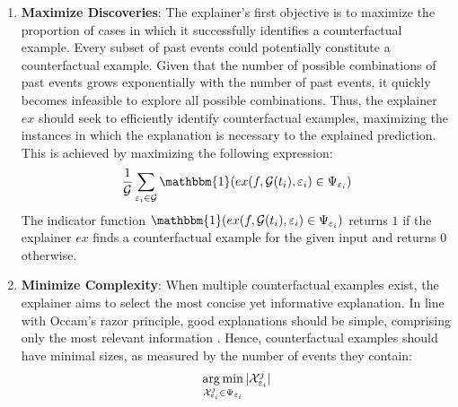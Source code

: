 \begin{enumerate}
    \item \textbf{Maximize Discoveries}: The explainer's first objective is to maximize the proportion of cases in which it successfully identifies a counterfactual example. Every subset of past events could potentially constitute a counterfactual example. Given that the number of possible combinations of past events grows exponentially with the number of past events, it quickly becomes infeasible to explore all possible combinations. Thus, the explainer $ex$ should seek to efficiently identify counterfactual examples, maximizing the instances in which the explanation is necessary to the explained prediction. This is achieved by maximizing the following expression:
    \begin{equation}
        \label{e_maxExplanationRate}
        \frac{1}{\mathcal{G}} \sum_{\varepsilon_{i} \in \mathcal{G}} \mathbbm{1}(ex(f, \mathcal{G}(t_i), \varepsilon_{i}) \in \Psi_{\varepsilon_i})
    \end{equation}
    The indicator function $\mathbbm{1}(ex(f, \mathcal{G}(t_i), \varepsilon_{i}) \in \Psi_{\varepsilon_i})$ returns $1$ if the explainer $ex$ finds a counterfactual example for the given input and returns $0$ otherwise.
    \item \textbf{Minimize Complexity}: When multiple counterfactual examples exist, the explainer aims to select the most concise yet informative explanation. In line with Occam’s razor principle, good explanations should be simple, comprising only the most relevant information \cite{yuan_explainability_2020, tan_learning_2022}. Hence, counterfactual examples should have minimal sizes, as measured by the number of events they contain:
    \begin{equation}
        \label{e_minCFExampleSize}
        \operatorname*{arg\,min}_{\mathcal{X}_{\varepsilon_i}^j \in \Psi_{\varepsilon_i}} |\mathcal{X}_{\varepsilon_i}^j|
    \end{equation}
\end{enumerate}




